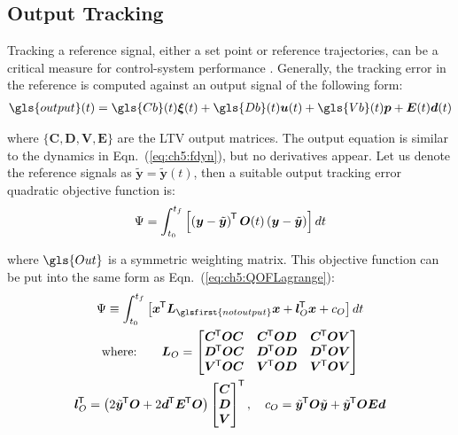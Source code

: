 \subsection{Output Tracking} \label{sec:ch5:output}

Tracking a reference signal, either a set point or reference trajectories, can be a critical measure for control-system performance \cite{Bryson1975a, Anderson2007a}.
Generally, the tracking error in the reference is computed against an output signal of the following form:
\begin{align}
\gls{output}(t) = \gls{Cb}(t) \bm{\xi}(t) + \gls{Db}(t) \bm{u}(t)  + \gls{Vb}(t) \bm{p} + \bm{E}(t)\bm{d}(t)
\end{align}

\noindent where $\{\bm{C}, \bm{D}, \bm{V}, \bm{E}\}$ are the LTV output matrices.
The output equation is similar to the dynamics in Eqn.~(\ref{eq:ch5:fdyn}), but no derivatives appear.
Let us denote the reference signals as $\tilde{\bm{y}} = \tilde{\bm{y}}(t)$, then a suitable output tracking error quadratic objective function is:
\begin{gather} \Psi =  \int_{t_0}^{t_f} \left[ \left( \bm{y} - \tilde{\bm{y}} \right)^{\mkern-1.5mu\mathsf{T}} \bm{O}(t) \left( \bm{y} - \tilde{\bm{y}} \right) \right] dt
\end{gather}

\noindent where $\gls{Out}$ is a symmetric weighting matrix. This objective function can be put into the same form as Eqn.~(\ref{eq:ch5:QOFLagrange}):%
\begin{subequations}
\begin{gather} \Psi \equiv \int_{t_0}^{t_f} \left[ \bm{x}\tran \bm{L}_{\glsfirst{notoutput}} \bm{x} + \bm{l}_{O}\tran \bm{x} + c_O\right] dt \\
\text{where:} \qquad 
\bm{L}_{O} = \begin{bmatrix}
\bm{C}\tran \bm{O} \bm{C} & \bm{C}\tran \bm{O} \bm{D} & \bm{C}\tran \bm{O} \bm{V} \\
\bm{D}\tran \bm{O} \bm{C} & \bm{D}\tran \bm{O} \bm{D} & \bm{D}\tran \bm{O} \bm{V}   \\
\bm{V}\tran \bm{O} \bm{C} & \bm{V}\tran \bm{O} \bm{D} & \bm{V}\tran \bm{O} \bm{V}   \\
\end{bmatrix} \\
\bm{l}_{O}\tran =  \left( 2 \tilde{\bm{y}}\tran \bm{O} + 2\bm{d}\tran \bm{E}\tran \bm{O} \right) \begin{bmatrix} \bm{C} \\ \bm{D} \\ \bm{V} \end{bmatrix}\tran, \quad 
c_O = \tilde{\bm{y}}\tran \bm{O} \tilde{\bm{y}} + \tilde{\bm{y}}\tran \bm{O} \bm{E} \bm{d}
\end{gather}
\end{subequations}%

